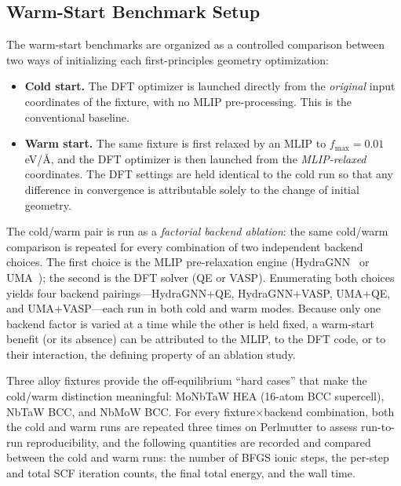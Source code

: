 \documentclass[conference]{IEEEtran}
\def\acs#1{#1}%
\begin{document}
\subsection{Warm-Start Benchmark Setup}
\label{sec:results:warmstart_setup}
The warm-start benchmarks are organized as a controlled comparison between two
ways of initializing each first-principles geometry optimization:

\begin{itemize}
\item \textbf{Cold start.} The \acs{DFT} optimizer is launched directly from the
  \emph{original} input coordinates of the fixture, with no \acs{MLIP}
  pre-processing. This is the conventional baseline.
\item \textbf{Warm start.} The same fixture is first relaxed by an \acs{MLIP}
  to $f_\text{max} = 0.01$\,eV/\AA, and the \acs{DFT} optimizer is then launched
  from the \emph{\acs{MLIP}-relaxed} coordinates. The \acs{DFT} settings are held
  identical to the cold run so that any difference in convergence is
  attributable solely to the change of initial geometry.
\end{itemize}

The cold/warm pair is run as a \emph{factorial backend ablation}: the same
cold/warm comparison is repeated for every combination of two independent
backend choices. The first choice is the \acs{MLIP} pre-relaxation engine
(HydraGNN~\cite{hydragnn} or UMA~\cite{wood2025uma}); the second is the \acs{DFT}
solver (\acs{QE} or \acs{VASP}). Enumerating both choices yields four backend
pairings---HydraGNN+\acs{QE}, HydraGNN+\acs{VASP}, UMA+\acs{QE}, and
UMA+\acs{VASP}---each run in both cold and warm modes. Because only one backend
factor is varied at a time while the other is held fixed, a warm-start benefit
(or its absence) can be attributed to the \acs{MLIP}, to the \acs{DFT} code, or to
their interaction, the defining property of an ablation study.

Three alloy fixtures provide the off-equilibrium ``hard cases'' that make the
cold/warm distinction meaningful: MoNbTaW \acs{HEA} (16-atom BCC supercell),
NbTaW BCC, and NbMoW BCC. For every
fixture$\times$backend combination, both the cold and warm runs are repeated
three times on Perlmutter to assess run-to-run reproducibility, and the
following quantities are recorded and compared between the cold and warm runs:
the number of \acs{BFGS} ionic steps, the per-step and total \acs{SCF} iteration
counts, the final total energy, and the wall time.
\end{document}
